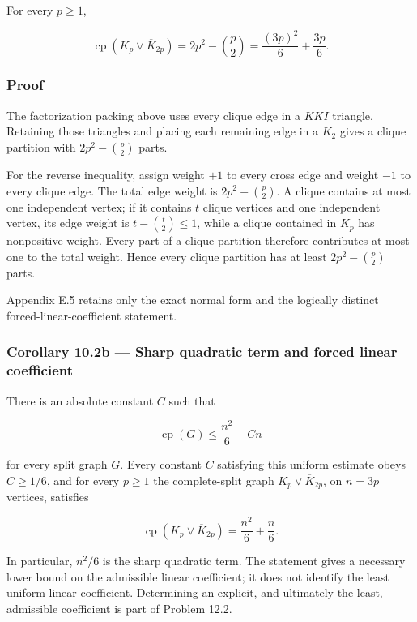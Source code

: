 \documentclass[english,11pt,a4paper]{article}
\begin{document}
For every \(p\ge1\),

\[
\operatorname{cp}\!\left(K_p\vee\overline K_{2p}\right)
=
2p^2-\binom p2
=
\frac{(3p)^2}{6}+\frac{3p}{6}.
\tag{10.1a}
\]

\subsubsection{Proof}\label{proof-6}

The factorization packing above uses every clique edge in a \(KKI\)
triangle. Retaining those triangles and placing each remaining edge in a
\(K_2\) gives a clique partition with \(2p^2-\binom p2\) parts.

For the reverse inequality, assign weight \(+1\) to every cross edge and
weight \(-1\) to every clique edge. The total edge weight is
\(2p^2-\binom p2\). A clique contains at most one independent vertex; if
it contains \(t\) clique vertices and one independent vertex, its edge
weight is \(t-\binom t2\le1\), while a clique contained in \(K_p\) has
nonpositive weight. Every part of a clique partition therefore
contributes at most one to the total weight. Hence every clique
partition has at least \(2p^2-\binom p2\) parts.

Appendix E.5 retains only the exact normal form and the logically
distinct forced-linear-coefficient statement.

\subsubsection{Corollary 10.2b --- Sharp quadratic term and forced
linear
coefficient}\label{corollary-10.2b-sharp-quadratic-term-and-forced-linear-coefficient}

There is an absolute constant \(C\) such that

\[
\operatorname{cp}(G)\le \frac{n^2}{6}+Cn
\]

for every split graph \(G\). Every constant \(C\) satisfying this
uniform estimate obeys \(C\ge1/6\), and for every \(p\ge1\) the
complete-split graph \(K_p\vee\overline K_{2p}\), on \(n=3p\) vertices,
satisfies

\[
\operatorname{cp}\!\left(K_p\vee\overline K_{2p}\right)
=\frac{n^2}{6}+\frac n6.
\]

In particular, \(n^2/6\) is the sharp quadratic term. The statement
gives a necessary lower bound on the admissible linear coefficient; it
does not identify the least uniform linear coefficient. Determining an
explicit, and ultimately the least, admissible coefficient is part of
Problem 12.2.
\end{document}
